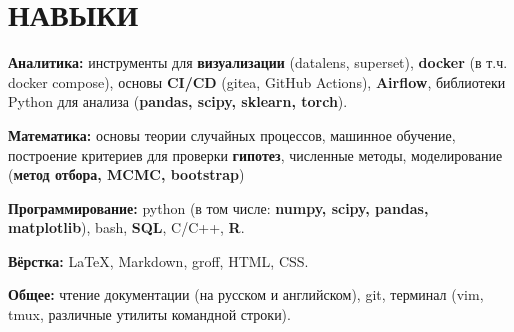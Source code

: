 \section{НАВЫКИ}

\begin{description}
  \setlength\itemsep{-0.4em}
\item{\bfseries Аналитика:} инструменты для \textbf{визуализации}
  (datalens, superset), \textbf{docker} (в т.ч. docker compose),
  основы \textbf{CI/CD} (gitea, GitHub Actions), \textbf{Airflow},
  библиотеки Python для анализа (\textbf{pandas, scipy, sklearn,
    torch}).
\item{\bfseries Математика:} основы теории случайных процессов,
  машинное обучение, построение критериев для проверки
  \textbf{гипотез}, численные методы, моделирование (\textbf{метод
    отбора, MCMC, bootstrap})
\item{\bfseries Программирование:} python (в том числе: \textbf{numpy,
    scipy, pandas, matplotlib}), bash, \textbf{SQL}, C/C++,
  \textbf{R}.
\item{\bfseries Вёрстка:} \LaTeX, Markdown, groff, HTML, CSS.
\item{\bfseries Общее:} чтение документации (на русском и английском),
  git, терминал (vim, tmux, различные утилиты командной строки).
\end{description}
